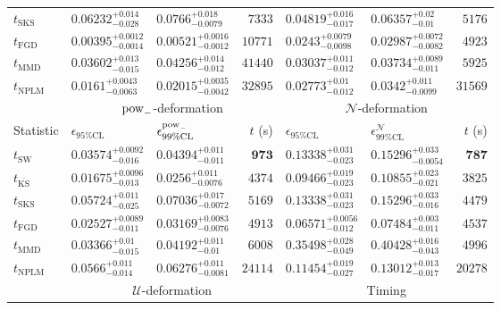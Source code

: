 \begin{tabular}{l|llr|llr}
	$t_{\mathrm{SKS}}$ & $0.06232_{-0.028}^{+0.014}$ & $0.0766_{-0.0079}^{+0.018}$ & $7333$ & $0.04819_{-0.017}^{+0.016}$ & $0.06357_{-0.01}^{+0.02}$ & $5176$ \\
	$t_{\mathrm{FGD}}$ & ${\mathbf{0.00395_{-0.0014}^{+0.0012}}}$ & ${\mathbf{0.00521_{-0.0012}^{+0.0016}}}$ & $10771$ & $0.0243_{-0.0098}^{+0.0079}$ & $0.02987_{-0.0082}^{+0.0072}$ & $4923$ \\
	$t_{\mathrm{MMD}}$ & $0.03602_{-0.015}^{+0.013}$ & $0.04256_{-0.012}^{+0.014}$ & $41440$ & $0.03037_{-0.012}^{+0.011}$ & $0.03734_{-0.011}^{+0.0089}$ & $5925$ \\
\rowcolor{red!35}	$t_{\mathrm{NPLM}}$ & $0.0161_{-0.0063}^{+0.0043}$ & $0.02015_{-0.0042}^{+0.0035}$ & $32895$ & $0.02773_{-0.012}^{+0.01}$ & $0.0342_{-0.0099}^{+0.011}$ & $31569$ \\
	\toprule
	\multicolumn{1}{c}{} & \multicolumn{3}{c}{$\rm{pow}_{-}$-deformation} & \multicolumn{3}{c}{$\mathcal{N}$-deformation} \\
	Statistic & $\epsilon_{95\%\mathrm{CL}}$ & $\epsilon^  {\rm{pow}_{-}}_{99\%\mathrm{CL}}$ & $t$ (s) & $\epsilon_{95\%\mathrm{CL}}$ & $\epsilon^    {\mathcal{N}}_{99\%\mathrm{CL}}$ & $t$ (s) \\
	\midrule
	$t_{\mathrm{SW}}$ & $0.03574_{-0.016}^{+0.0092}$ & $0.04394_{-0.011}^{+0.011}$ & ${\mathbf{973}}$ & $0.13338_{-0.023}^{+0.031}$ & $0.15296_{-0.0054}^{+0.033}$ & ${\mathbf{787}}$ \\
	$t_{\overline{\mathrm{KS}}}$ & ${\mathbf{0.01675_{-0.013}^{+0.0096}}}$ & ${\mathbf{0.0256_{-0.0076}^{+0.011}}}$ & $4374$ & $0.09466_{-0.023}^{+0.019}$ & $0.10855_{-0.021}^{+0.023}$ & $3825$ \\
	$t_{\mathrm{SKS}}$ & $0.05724_{-0.025}^{+0.011}$ & $0.07036_{-0.0072}^{+0.017}$ & $5169$ & $0.13338_{-0.023}^{+0.031}$ & $0.15296_{-0.016}^{+0.033}$ & $4479$ \\
	$t_{\mathrm{FGD}}$ & $0.02527_{-0.011}^{+0.0089}$ & $0.03169_{-0.0076}^{+0.0083}$ & $4913$ & ${\mathbf{0.06571_{-0.012}^{+0.0056}}}$ & ${\mathbf{0.07484_{-0.011}^{+0.003}}}$ & $4537$ \\
	$t_{\mathrm{MMD}}$ & $0.03366_{-0.015}^{+0.01}$ & $0.04192_{-0.01}^{+0.011}$ & $6008$ & $0.35498_{-0.049}^{+0.028}$ & $0.40428_{-0.043}^{+0.016}$ & $4996$ \\
\rowcolor{red!35}	$t_{\mathrm{NPLM}}$ & $0.0566_{-0.014}^{+0.011}$ & $0.06276_{-0.0081}^{+0.011}$ & $24114$ & $0.11454_{-0.027}^{+0.019}$ & $0.13012_{-0.017}^{+0.013}$ & $20278$ \\
	\toprule
	\multicolumn{1}{c}{} & \multicolumn{3}{c}{$\mathcal{U}$-deformation} & \multicolumn{3}{c}{Timing} \\

\end{tabular}
